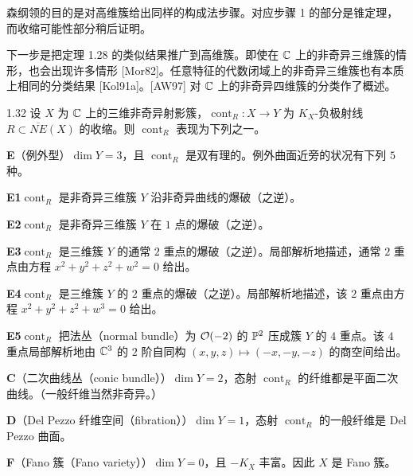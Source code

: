 森纲领的目的是对高维簇给出同样的构成法步骤。对应步骤 1 的部分是锥定理，而收缩可能性部分稍后证明。

下一步是把定理 1.28 的类似结果推广到高维簇。即使在 $\mathbb{C}$ 上的非奇异三维簇的情形，也会出现许多情形 [Mor82]。任意特征的代数闭域上的非奇异三维簇也有本质上相同的分类结果 [Kol91a]。[AW97] 对 $\mathbb{C}$ 上的非奇异四维簇的分类作了概述。

\begin{theorem}[{[Mor82]}]{1.32}
设 $X$ 为 $\mathbb{C}$ 上的三维非奇异射影簇，$\operatorname{cont}_R:X\to Y$ 为 $K_X$-负极射线 $R\subset\overline{NE}(X)$ 的收缩。则 $\operatorname{cont}_R$ 表现为下列之一。

\textbf{E}（例外型）\quad $\dim Y=3$，且 $\operatorname{cont}_R$ 是双有理的。例外曲面近旁的状况有下列 $5$ 种。

\par\smallskip\noindent\hspace{1.2em}\textbf{E1}\quad $\operatorname{cont}_R$ 是非奇异三维簇 $Y$ 沿非奇异曲线的爆破（之逆）。

\par\smallskip\noindent\hspace{1.2em}\textbf{E2}\quad $\operatorname{cont}_R$ 是非奇异三维簇 $Y$ 在 $1$ 点的爆破（之逆）。

\par\smallskip\noindent\hspace{1.2em}\textbf{E3}\quad $\operatorname{cont}_R$ 是三维簇 $Y$ 的通常 $2$ 重点的爆破（之逆）。局部解析地描述，通常 $2$ 重点由方程 $x^2+y^2+z^2+w^2=0$ 给出。

\par\smallskip\noindent\hspace{1.2em}\textbf{E4}\quad $\operatorname{cont}_R$ 是三维簇 $Y$ 的 $2$ 重点的爆破（之逆）。局部解析地描述，该 $2$ 重点由方程 $x^2+y^2+z^2+w^3=0$ 给出。

\par\smallskip\noindent\hspace{1.2em}\textbf{E5}\quad $\operatorname{cont}_R$ 把法丛（normal bundle）为 $\mathcal{O}(-2)$ 的 $\mathbb{P}^2$ 压成簇 $Y$ 的 $4$ 重点。该 $4$ 重点局部解析地由 $\mathbb{C}^3$ 的 $2$ 阶自同构 $(x,y,z)\mapsto(-x,-y,-z)$ 的商空间给出。

\textbf{C}（二次曲线丛（conic bundle））\quad $\dim Y=2$，态射 $\operatorname{cont}_R$ 的纤维都是平面二次曲线。（一般纤维当然非奇异。）

\textbf{D}（Del Pezzo 纤维空间（fibration））\quad $\dim Y=1$，态射 $\operatorname{cont}_R$ 的一般纤维是 Del Pezzo 曲面。

\textbf{F}（Fano 簇（Fano variety））\quad $\dim Y=0$，且 $-K_X$ 丰富。因此 $X$ 是 Fano 簇。
\end{theorem}

